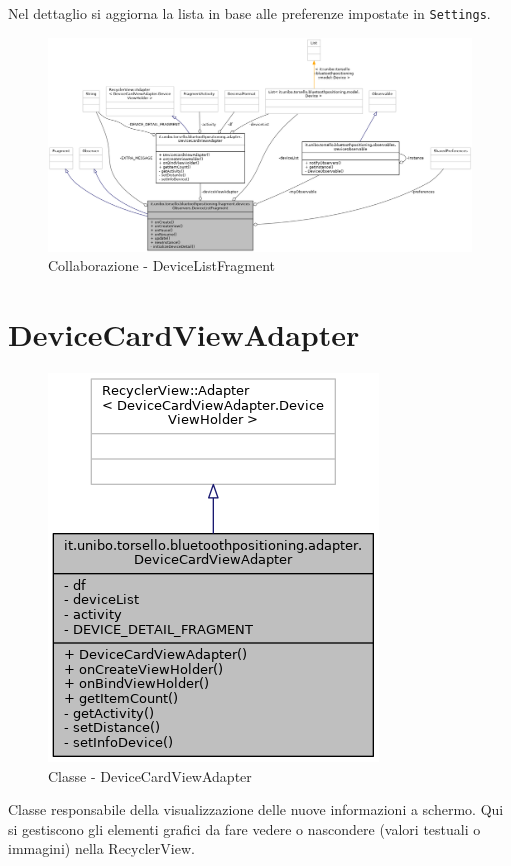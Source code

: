 Nel dettaglio si aggiorna la lista in base alle preferenze impostate in \texttt{Settings}.

\begin{figure}[ph]
	\centering
	\includegraphics[width=1.9\linewidth,angle=90]{img/uml/class/classit_1_1unibo_1_1torsello_1_1bluetoothpositioning_1_1fragment_1_1devicesObservers_1_1DeviceListFragment__coll__graph.png}
	\caption{Collaborazione - DeviceListFragment}
\end{figure}

\newpage
\section{DeviceCardViewAdapter}
\begin{figure}[ph]
	\centering
	\includegraphics[width=0.5\linewidth]{img/uml/class/classit_1_1unibo_1_1torsello_1_1bluetoothpositioning_1_1adapter_1_1DeviceCardViewAdapter__inherit__graph.png}
	\caption{Classe - DeviceCardViewAdapter}
\end{figure}

Classe responsabile della visualizzazione delle nuove informazioni a schermo. Qui si gestiscono gli elementi grafici da fare vedere o nascondere (valori testuali o immagini) nella RecyclerView.

